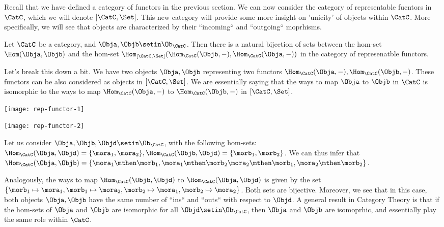 Recall that we have defined a category of functors in the previous section. We can now consider the category of representable fucntors in $\CatC$, which we will denote $[\CatC, \Set]$. This new category will provide some more insight on 'unicity' of objects within $\CatC$. More specifically, we will see that objects are characterized by their ``incoming`` and ``outgoing`` moprhisms.


\begin{theorem}
Let $\CatC$ be a category, and $\Obja, \Objb \setin \Ob_\CatC$. Then there is a natural bijection of sets between the hom-set $\Hom(\Obja,\Objb)$ and the hom-set  $\Hom_{[\CatC, \Set]}(\Hom_\CatC(\Objb, -), \Hom_\CatC(\Obja, -))$ in the category of represenatble functors.
\end{theorem}
Let's break this down a bit. We have two objects $\Obja, \Objb$ representing two functors $\Hom_\CatC(\Obja,-), \Hom_\CatC(\Objb,-)$. These functors can be also considered as objects in $[\CatC, \Set]$. We are essentially saying that the ways to map $\Obja$ to $\Objb$ in $\CatC$ is isomorphic to the ways to map $\Hom_\CatC(\Obja,-)$ to $ \Hom_\CatC(\Objb,-)$ in $[\CatC, \Set]$. 

\begin{example}
\begin{marginfigure}
\centering
\texttt{[image: rep-functor-1]}
\label{fig:rep-functor-1}
\end{marginfigure}

\begin{marginfigure}
\centering
\texttt{[image: rep-functor-2]}
\label{fig:rep-functor-2}
\end{marginfigure}
Let us consider $\Obja, \Objb, \Objd \setin \Ob_\CatC$, with the following hom-sets: $\Hom_\CatC(\Obja, \Objd) = \{\mora_1,\mora_2\}, \Hom_\CatC(\Objb, \Objd) = \{\morb_1,\morb_2\}$. We can thus infer that $\Hom_\CatC(\Obja, \Objb) = \{\mora_1\mthen\morb_1, \mora_1\mthen\morb_2 \mora_2\mthen\morb_1, \mora_2\mthen\morb_2 \}$.

Analogously, the ways to map $\Hom_\CatC(\Objb, \Objd)$ to $\Hom_\CatC(\Obja, \Objd)$ is given by the set $\{\morb_1 \mapsto \mora_1, \morb_1 \mapsto \mora_2, \morb_2 \mapsto \mora_1, \morb_2 \mapsto \mora_2\}$. Both sets are bijective. Moreover, we see that in this case, both objects $\Obja, \Objb$ have the same number of ``ins`` and ``outs`` with respect to $\Objd$. A general result in Category Theory is that if the hom-sets of $\Obja$ and $\Objb$ are isomorphic for all $\Objd \setin \Ob_\CatC$, then $\Obja$ and $\Objb$ are isomoprhic, and essentially play the same role within $\CatC$.
\end{example}



